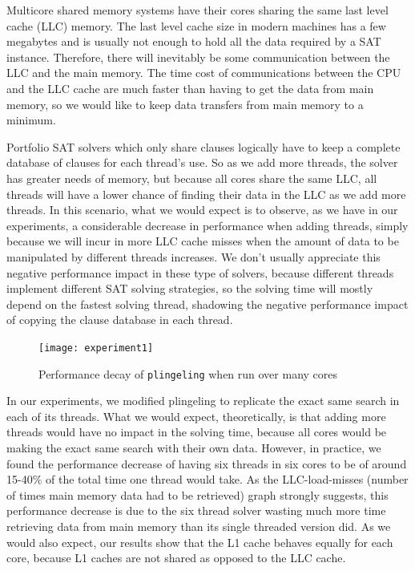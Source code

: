 \documentclass{llncs}
\begin{document}
Multicore shared memory systems have their cores sharing the same last level cache (LLC) memory. The last level cache size in modern machines has a few megabytes and is usually not enough to hold all the data required by a SAT instance. Therefore, there will inevitably be some communication between the LLC and the main memory. The time cost of communications between the CPU and the LLC cache are much faster than having to get the data from main memory, so we would like to keep data transfers from main memory to a minimum. 

Portfolio SAT solvers which only share clauses logically have to keep a complete database of clauses for each thread's use. So as we add more threads, the solver has greater needs of memory, but because all cores share the same LLC, all threads will have a lower chance of finding their data in the LLC as we add more threads. In this scenario, what we would expect is to observe, as we have in our experiments, a considerable decrease in performance when adding threads, simply because we will incur in more LLC cache misses when the amount of data to be manipulated by different threads increases. We don't usually appreciate this negative performance impact in these type of solvers, because different threads implement different SAT solving strategies, so the solving time will mostly depend on the fastest solving thread, shadowing the negative performance impact of copying the clause database in each thread.

\begin{figure}[tp]
  \centering
  \texttt{[image: experiment1]}
  \caption{Performance decay of {\tt plingeling} when run over many cores}
  \label{fig:decay}
\end{figure}

In our experiments, we modified plingeling to replicate the exact same search in each of its threads. What we would expect, theoretically, is that adding more threads would have no impact in the solving time, because all cores would be making the exact same search with their own data. However, in practice, we found the performance decrease of having six threads in six cores to be of around 15-40\% of the total time one thread would take. As the LLC-load-misses (number of times main memory data had to be retrieved) graph strongly suggests, this performance decrease is due to the six thread solver wasting much more time retrieving data from main memory than its single threaded version did. As we would also expect, our results show that the L1 cache behaves equally for each core, because L1 caches are not shared as opposed to the LLC cache.
\end{document}
